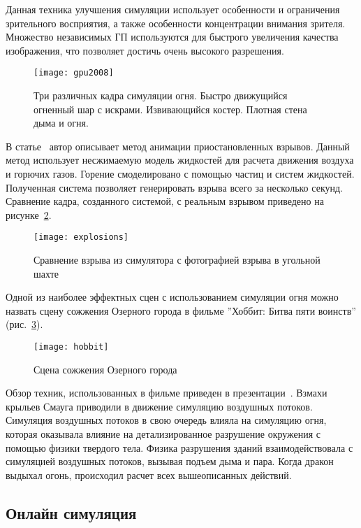 Данная техника улучшения симуляции использует особенности и ограничения
зрительного восприятия, а также особенности концентрации внимания зрителя.
Множество независимых ГП используются для быстрого увеличения качества
изображения, что позволяет достичь очень высокого разрешения.
\begin{figure}[htb]
	\centering
	\texttt{[image: gpu2008]}
	\caption{Три различных кадра симуляции огня. Быстро движущийся огненный
	шар с искрами. Извивающийся костер. Плотная стена дыма и огня.}%
    \label{fig:gpu2008}
\end{figure}

В статье~\cite{suspendedExplosions} автор описывает метод анимации
приостановленных взрывов. Данный метод использует несжимаемую модель жидкостей
для расчета движения воздуха и горючих газов. Горение смоделировано с помощью
частиц и систем жидкостей. Полученная система позволяет генерировать взрыва
всего за несколько секунд. Сравнение кадра, созданного системой, с реальным
взрывом приведено на рисунке~\ref{fig:explosions}.
\begin{figure}[htb]
	\centering
	\texttt{[image: explosions]}
	\caption{Сравнение взрыва из симулятора с фотографией взрыва в угольной
    шахте}%
    \label{fig:explosions}
\end{figure}

Одной из наиболее эффектных сцен с использованием симуляции огня можно назвать
сцену сожжения Озерного города в фильме ''Хоббит: Битва пяти воинств''
(рис.~\ref{fig:hobbit}).
\begin{figure}[htb]
    \centering
    \texttt{[image: hobbit]}
    \caption{Сцена сожжения Озерного города}%
    \label{fig:hobbit}
\end{figure}
Обзор техник, использованных в фильме приведен в
презентации~\cite{hobbitSlides}.  Взмахи крыльев Смауга приводили в движение
симуляцию воздушных потоков.  Симуляция воздушных потоков в свою очередь влияла
на симуляцию огня, которая оказывала влияние на детализированное разрушение
окружения с помощью физики твердого тела. Физика разрушения зданий
взаимодействовала с симуляцией воздушных потоков, вызывая подъем дыма и пара.
Когда дракон выдыхал огонь, происходил расчет всех вышеописанных действий.

\subsection{Онлайн симуляция}

